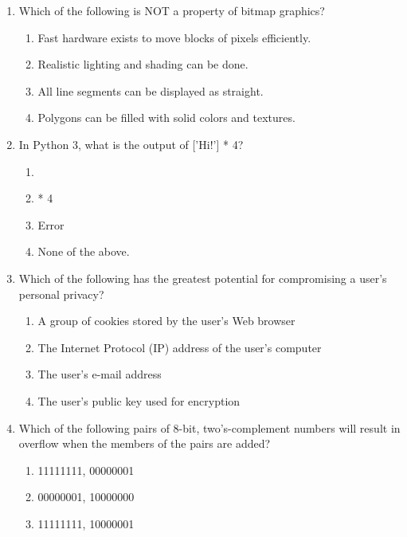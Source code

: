 \documentclass[12pt]{article}
\begin{document}
\begin{enumerate}[label=\arabic*.]
\begin{enumerate}[label=(\alph*)]
    \item Identifier length
    \item Maximum level of nesting
    \item Operator precedence
    \item Type compatibility
\end{enumerate}
\item Which of the following is NOT a property of bitmap graphics?
\begin{enumerate}[label=(\alph*)]
    \item Fast hardware exists to move blocks of pixels efficiently.
    \item Realistic lighting and shading can be done.
    \item All line segments can be displayed as straight.
    \item Polygons can be filled with solid colors and textures.
\end{enumerate}
\item In Python 3, what is the output of ['Hi!'] * 4?
\begin{enumerate}[label=(\alph*)]
    \item ['Hi!', 'Hi!', 'Hi!', 'Hi!']
    \item ['Hi!'] * 4
    \item Error
    \item None of the above.
\end{enumerate}
\item Which of the following has the greatest potential for compromising a user's personal privacy?
\begin{enumerate}[label=(\alph*)]
    \item A group of cookies stored by the user's Web browser
    \item The Internet Protocol (IP) address of the user's computer
    \item The user's e-mail address
    \item The user's public key used for encryption
\end{enumerate}
\item Which of the following pairs of 8-bit, two's-complement numbers will result in overflow when the members of the pairs are added?
\begin{enumerate}[label=(\alph*)]
    \item 11111111, 00000001
    \item 00000001, 10000000
    \item 11111111, 10000001

\end{enumerate}
\end{enumerate}
\end{document}
